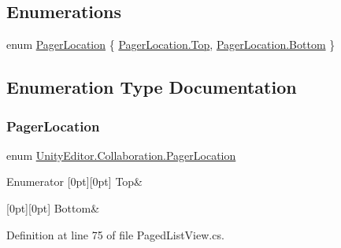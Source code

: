 \subsection*{Enumerations}
\begin{DoxyCompactItemize}
\item 
enum \mbox{\hyperlink{namespace_unity_editor_1_1_collaboration_a5677c358149413818cab58b95c3d588c}{Pager\+Location}} \{ \mbox{\hyperlink{namespace_unity_editor_1_1_collaboration_a5677c358149413818cab58b95c3d588caa4ffdcf0dc1f31b9acaf295d75b51d00}{Pager\+Location.\+Top}}, 
\mbox{\hyperlink{namespace_unity_editor_1_1_collaboration_a5677c358149413818cab58b95c3d588ca2ad9d63b69c4a10a5cc9cad923133bc4}{Pager\+Location.\+Bottom}}
 \}
\end{DoxyCompactItemize}


\subsection{Enumeration Type Documentation}
\mbox{\label{namespace_unity_editor_1_1_collaboration_a5677c358149413818cab58b95c3d588c}} 
\subsubsection{\texorpdfstring{PagerLocation}{PagerLocation}}
{\footnotesize\ttfamily enum \mbox{\hyperlink{namespace_unity_editor_1_1_collaboration_a5677c358149413818cab58b95c3d588c}{Unity\+Editor.\+Collaboration.\+Pager\+Location}}\hspace{0.3cm}{\ttfamily [strong]}}

\begin{DoxyEnumFields}{Enumerator}
[0pt][0pt]{}\mbox{\label{namespace_unity_editor_1_1_collaboration_a5677c358149413818cab58b95c3d588caa4ffdcf0dc1f31b9acaf295d75b51d00}} 
Top&\\
\hline

[0pt][0pt]{}\mbox{\label{namespace_unity_editor_1_1_collaboration_a5677c358149413818cab58b95c3d588ca2ad9d63b69c4a10a5cc9cad923133bc4}} 
Bottom&\\
\hline

\end{DoxyEnumFields}


Definition at line 75 of file Paged\+List\+View.\+cs.

